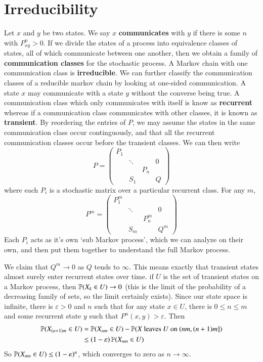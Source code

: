 \section{Irreducibility}

Let $x$ and $y$ be two states. We say $x$ {\bf communicates} with $y$ if there is some $n$ with $P^n_{xy} > 0$. If we divide the states of a process into equivalence classes of states, all of which communicate between one another, then we obtain a family of {\bf communication classes} for the stochastic process. A Markov chain with one communication class is {\bf irreducible}. We can further classify the communication classes of a reducible markov chain by looking at one-sided communication. A state $x$ may communicate with a state $y$ without the converse being true. A communication class which only communicates with itself is know as {\bf recurrent} whereas if a communication class communicates with other classes, it is known as {\bf transient}. By reordering the entries of $P$, we may assume the states in the same communication class occur continguously, and that all the recurrent communication classes occur before the transient classes. We can then write
%
\[ P = \begin{pmatrix} P_1 & & & \\ &\ddots & & 0 \\  & & P_n & \\ & S_1 & & Q \end{pmatrix} \]
%
where each $P_i$ is a stochastic matrix over a particular recurrent class. For any $m$,
%
\[ P^m = \begin{pmatrix} P_1^m & & & \\ &\ddots & & 0 \\  & & P^m_n & \\ & S_m & & Q^m \end{pmatrix} \]
%
Each $P_i$ acts as it's own `sub Markov process', which we can analyze on their own, and then put them together to understand the full Markov process.

We claim that $Q^m \to 0$ as $Q$ tends to $\infty$. This means exactly that transient states almost surely enter recurrent states over time. if $U$ is the set of transient states on a Markov process, then $\operatorname{\mathbb{P}}(X_k \in U) \to 0$ (this is the limit of the probability of a decreasing family of sets, so the limit certainly exists). Since our state space is infinite, there is $\varepsilon > 0$ and $n$ such that for any state $x \in U$, there is $0 \leq n \leq m$ and some recurrent state $y$ such that $P^n(x,y) > \varepsilon$. Then
%
\begin{align*}
    \PP(X_{(n+1)m} \in U) &= \PP(X_{nm} \in U) - \PP(X\ \text{leaves}\ U\ \text{on}\ (nm,(n+1)m])\\
    &\leq (1 - \varepsilon) \PP(X_{nm} \in U)
\end{align*}
%
So $\operatorname{\mathbb{P}}(X_{nm} \in U) \leq (1 - \varepsilon)^n$, which converges to zero as $n \to \infty$.

